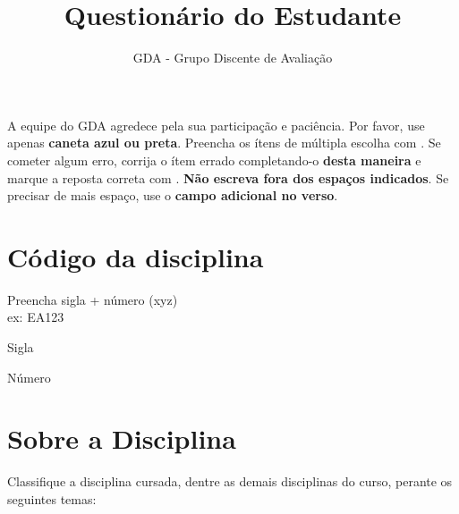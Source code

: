 \documentclass[
  portuguese,
  ]{sdaps}
\author{GDA - Grupo Discente de Avaliação}
\title{Questionário do Estudante}
\begin{document}
  \begin{questionnaire}[noinfo]
    \begin{info}
      A equipe do GDA agredece pela sua participação e paciência. Por favor, use apenas {\bf caneta azul ou preta}. Preencha os ítens de múltipla escolha com \checkedbox{}. Se cometer algum erro, corrija o ítem errado completando-o {\bf desta maneira} \correctedbox{} e marque a reposta correta com \checkedbox{}. {\bf Não escreva fora dos espaços indicados}. Se precisar de mais espaço, use o {\bf campo adicional no verso}.
    \end{info}


  	\section{Código da disciplina}  
		  \begin{multicols}{3}
		  	Preencha sigla + número (xyz) \\ ex: EA123
				\begin{choicequestion}[3]{Sigla}
				\end{choicequestion}
				
				\begin{choicegroup}{Número}

				\end{choicegroup}
			\end{multicols}

			\section{Sobre a Disciplina}
				\begin{markgroup}{Classifique a disciplina cursada, dentre as demais disciplinas do curso, perante os seguintes temas:}
				\end{markgroup}
				

\end{questionnaire}
\end{document}
